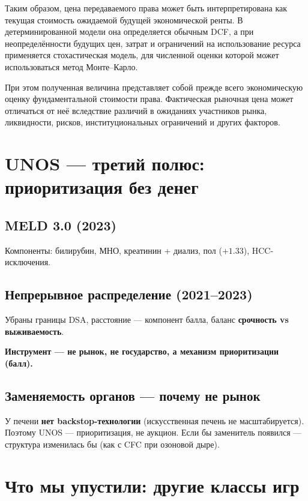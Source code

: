 \documentclass[12pt]{article}
\begin{document}
Таким образом, цена передаваемого права может быть интерпретирована как текущая стоимость ожидаемой будущей экономической ренты. В детерминированной модели она определяется обычным DCF, а при неопределённости будущих цен, затрат и ограничений на использование ресурса применяется стохастическая модель, для численной оценки которой может использоваться метод Монте--Карло.

При этом полученная величина представляет собой прежде всего экономическую оценку фундаментальной стоимости права. Фактическая рыночная цена может отличаться от неё вследствие различий в ожиданиях участников рынка, ликвидности, рисков, институциональных ограничений и других факторов.

\section{UNOS --- третий полюс: приоритизация без денег}

\subsection{MELD 3.0 (2023)}
Компоненты: билирубин, МНО, креатинин + диализ, пол ($+1.33$), HCC-исключения.

\subsection{Непрерывное распределение (2021--2023)}
Убраны границы DSA, расстояние --- компонент балла, баланс \textbf{срочность vs выживаемость}.

\textbf{Инструмент --- не рынок, не государство, а механизм приоритизации (балл).}

\subsection{Заменяемость органов --- почему не рынок}
У печени \textbf{нет backstop-технологии} (искусственная печень не масштабируется). Поэтому UNOS --- приоритизация, не аукцион. Если бы заменитель появился --- структура изменилась бы (как с CFC при озоновой дыре).

\section{Что мы упустили: другие классы игр}
\end{document}
